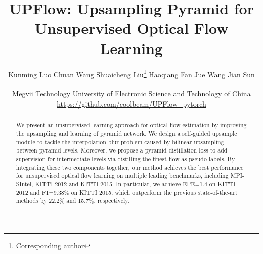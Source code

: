 \documentclass[final]{cvpr}
\begin{document}
	
\title{UPFlow: Upsampling Pyramid for Unsupervised Optical Flow Learning}
	
	\author{Kunming Luo \quad
		Chuan Wang \quad
		Shuaicheng Liu\thanks{Corresponding author}  \quad
		Haoqiang Fan\quad
		Jue Wang \quad
		Jian Sun \\\\
		Megvii Technology \quad
		University of Electronic Science and Technology of China
		\\
		\url{https://github.com/coolbeam/UPFlow_pytorch}
}
	


	\maketitle
	
	
\begin{abstract}\label{sec:abs}
		We present an unsupervised learning approach for optical flow estimation by improving the upsampling and learning of pyramid network. 
		We design a self-guided upsample module to tackle the interpolation blur problem caused by bilinear upsampling between pyramid levels. Moreover, we propose a pyramid distillation loss to add supervision for intermediate levels via distilling the finest flow as pseudo labels.
		By integrating these two components together, our method achieves the best performance for unsupervised optical flow learning on multiple leading benchmarks, including MPI-SIntel, KITTI 2012 and KITTI 2015. 
		In particular, we achieve EPE=1.4 on KITTI 2012 and F1=9.38\% on KITTI 2015, which outperform the previous state-of-the-art methods by 22.2\% and 15.7\%, respectively. 
	\end{abstract} 
\end{document}

